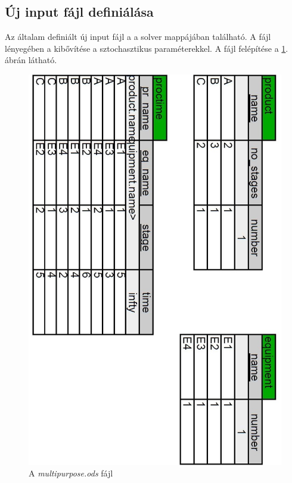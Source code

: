 \subsection{Új input fájl definiálása}
Az általam definiált új input fájl a  a solver  mappájában található.
A fájl lényegében a  kibővítése a sztochasztikus paraméterekkel.
A  fájl felépítése a \ref{multipurpose_odshere}. ábrán látható.
\begin{figure}[H]
\begin{center}
\includegraphics[scale=0.4]{multipurposeOds}
\caption{A \textit{multipurpose.ods} fájl}
\label{multipurpose_odshere}
\end{center}
\end{figure}
